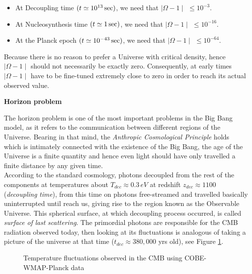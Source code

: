 \documentclass{rmaa}
\begin{document}
\begin{itemize}
\item At Decoupling time  $(t \simeq 10^{13}\, {\rm sec})$, we need that $\mid \Omega-1 \mid$ $\le 10^{-3}$.
\item  At Nucleosynthesis time $(t \simeq 1\, {\rm sec})$, we need that $\mid \Omega-1 \mid$ $\le 10^{-16}$.
\item  At the Planck epoch $(t \simeq 10^{-43}\, {\rm sec})$, we need that $\mid \Omega-1 \mid$  $\le 10^{-64}$.
\end{itemize}
% 
%
Because there is no reason to prefer a Universe with critical density, hence
$\mid \Omega-1\mid$ should not necessarily be exactly zero. 
Consequently, at early times 
$\mid \Omega-1\mid$ have to be fine-tuned extremely close to zero in order to reach 
its actual observed value.



\vskip 16pt
\textbf{Horizon problem} 
\vskip 10pt

The horizon problem is one of the most important problems in the Big Bang model,
as it refers to the communication between different regions of the Universe. 
%
Bearing in that mind, the \textit{Anthropic Cosmological Principle} holds 
\citep{Barrow, Coles} which is intimately connected
with the existence of the Big Bang, the age of the Universe is a finite quantity and hence
even light should have only travelled a finite distance by any given time. 
\\

According to the standard cosmology, photons decoupled from the rest of the 
components at temperatures about $T_{dec}\approx 0.3\, eV$ at redshift
$z_{dec} \approx 1100$ (\textit{decoupling time}), from this time on photons free-streamed and travelled basically
 uninterrupted until reach us, giving rise to the region known as the Observable Universe.
 This spherical surface, at which decoupling process occurred, is called 
\textit{surface of last scattering}.
The primordial photons are responsible for the CMB radiation observed today, then looking at its
fluctuations is analogous of taking a picture of the universe at that time 
($t_{dec}\approx 380,000$ yrs old), see Figure \ref{fig:wmap5}.
\\

\begin{figure}[t!] 
\centerline{ \epsfxsize=210pt  }
\caption{Temperature fluctuations observed in the CMB using 
 COBE-WMAP-Planck data \citep{Gold, Planckxi, Planckxvi}}
\label{fig:wmap5}
\end{figure}
\end{document}
